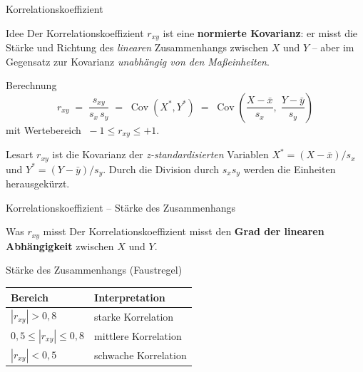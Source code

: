 \documentclass[aspectratio=169,11pt]{beamer}
\begin{document}
\begin{frame}{Korrelationskoeffizient}
  \begin{block}{Idee}
    Der Korrelationskoeffizient $r_{xy}$ ist eine
    \textbf{normierte Kovarianz}: er misst die Stärke und Richtung des
    \emph{linearen} Zusammenhangs zwischen $X$ und $Y$ -- aber im
    Gegensatz zur Kovarianz \emph{unabhängig von den Maßeinheiten}.
  \end{block}

  \begin{block}{Berechnung}
    \[
      r_{xy} \;=\; \frac{s_{xy}}{s_x \, s_y}
             \;=\; \operatorname{Cov}(X^{*},Y^{*})
             \;=\; \operatorname{Cov}\!\left(
                     \frac{X-\bar{x}}{s_x},\;
                     \frac{Y-\bar{y}}{s_y}
                   \right)
    \]
    mit Wertebereich $\;-1 \le r_{xy} \le +1$.
  \end{block}


  \begin{exampleblock}{Lesart}
    $r_{xy}$ ist die Kovarianz der \emph{z-standardisierten} Variablen
    $X^{*} = (X-\bar{x})/s_x$ und $Y^{*} = (Y-\bar{y})/s_y$. Durch die
    Division durch $s_x s_y$ werden die Einheiten herausgekürzt.
  \end{exampleblock}
\end{frame}

\begin{frame}{Korrelationskoeffizient -- Stärke des Zusammenhangs}
  \begin{block}{Was $r_{xy}$ misst}
    Der Korrelationskoeffizient misst den \textbf{Grad der linearen
    Abhängigkeit} zwischen $X$ und $Y$.
  \end{block}

  \medskip

  \begin{block}{Stärke des Zusammenhangs (Faustregel)}
    \begin{center}
      \renewcommand{\arraystretch}{1.2}
      \begin{tabular}{ll}
        \toprule
        \textbf{Bereich} & \textbf{Interpretation} \\
        \midrule
        $|r_{xy}| > 0{,}8$               & starke Korrelation \\
        $0{,}5 \le |r_{xy}| \le 0{,}8$   & mittlere Korrelation \\
        $|r_{xy}| < 0{,}5$               & schwache Korrelation \\
        \bottomrule
      \end{tabular}
    \end{center}
  \end{block}
\end{frame}
\end{document}
